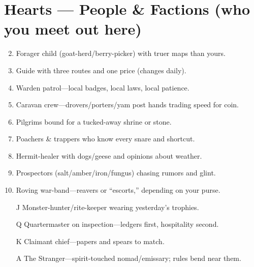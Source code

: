 \section*{Hearts --- People \& Factions (who you meet out here)}
\label{sec:wilderness-people}
\begin{enumerate}
\setcounter{enumi}{1}
\item Forager child (goat-herd/berry-picker) with truer maps than yours.
\item Guide with three routes and one price (changes daily).
\item Warden patrol---local badges, local laws, local patience.
\item Caravan crew---drovers/porters/yam post hands trading speed for coin.
\item Pilgrims bound for a tucked-away shrine or stone.
\item Poachers \& trappers who know every snare and shortcut.
\item Hermit-healer with dogs/geese and opinions about weather.
\item Prospectors (salt/amber/iron/fungus) chasing rumors and glint.
\item Roving war-band---reavers or ``escorts,'' depending on your purse.
\item[J] Monster-hunter/rite-keeper wearing yesterday's trophies.
\item[Q] Quartermaster on inspection---ledgers first, hospitality second.
\item[K] Claimant chief---papers and spears to match.
\item[A] The Stranger---spirit-touched nomad/emissary; rules bend near them.
\end{enumerate}

